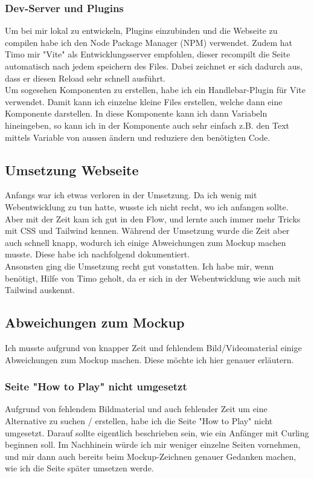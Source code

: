 \documentclass[11pt]{article}
\begin{document}
    \subsubsection{Dev-Server und Plugins}
    Um bei mir lokal zu entwickeln, Plugins einzubinden und die Webseite zu compilen habe ich den Node Package Manager (NPM) verwendet.
    Zudem hat Timo mir "Vite" als Entwicklungsserver empfohlen, dieser recompilt die Seite automatisch nach jedem speichern des Files.
    Dabei zeichnet er sich dadurch aus, dass er diesen Reload sehr schnell ausführt.\\
    Um sogesehen Komponenten zu erstellen, habe ich ein Handlebar-Plugin für Vite verwendet. Damit kann ich einzelne kleine Files erstellen,
    welche dann eine Komponente darstellen. In diese Komponente kann ich dann Variabeln hineingeben, so kann ich in der Komponente auch sehr
    einfach z.B. den Text mittels Variable von aussen ändern und reduziere den benötigten Code.

    \subsection{Umsetzung Webseite}
    Anfangs war ich etwas verloren in der Umsetzung. Da ich wenig mit Webentwicklung zu tun hatte, wusste ich nicht recht, wo ich anfangen sollte.
    Aber mit der Zeit kam ich gut in den Flow, und lernte auch immer mehr Tricks mit CSS und Tailwind kennen. Während der Umsetzung wurde die Zeit
    aber auch schnell knapp, wodurch ich einige Abweichungen zum Mockup machen musste. Diese habe ich nachfolgend dokumentiert.\\
    Ansonsten ging die Umsetzung recht gut vonstatten. Ich habe mir, wenn benötigt, Hilfe von Timo geholt, da er sich in der Webentwicklung wie auch
    mit Tailwind auskennt.

    \subsection{Abweichungen zum Mockup}
    Ich musste aufgrund von knapper Zeit und fehlendem Bild/Videomaterial einige Abweichungen zum Mockup machen. Diese möchte ich hier genauer erläutern.

    \subsubsection{Seite "How to Play" nicht umgesetzt}
    Aufgrund von fehlendem Bildmaterial und auch fehlender Zeit um eine Alternative zu suchen / erstellen, habe ich die Seite "How to Play" nicht umgesetzt.
    Darauf sollte eigentlich beschrieben sein, wie ein Anfänger mit Curling beginnen soll. Im Nachhinein würde ich mir weniger einzelne Seiten vornehmen, und
    mir dann auch bereits beim Mockup-Zeichnen genauer Gedanken machen, wie ich die Seite später umsetzen werde.
\end{document}
